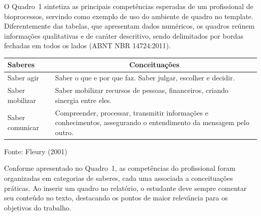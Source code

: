 O Quadro~1 sintetiza as principais competências esperadas de um profissional de bioprocessos, servindo como exemplo de uso do ambiente de quadro no template. Diferentemente das tabelas, que apresentam dados numéricos, os quadros reúnem informações qualitativas e de caráter descritivo, sendo delimitados por bordas fechadas em todos os lados (ABNT NBR 14724:2011).

\centering
{}
\begin{center}
\begin{tabular}{|>{\centering\arraybackslash}m{3.5cm}|m{9cm}|}
\hline
\textbf{Saberes} & \multicolumn{1}{c|}{\textbf{Conceituações}} \\
\hline
Saber agir      & Saber o que e por que faz. Saber julgar, escolher e decidir. \\
\hline
Saber mobilizar & Saber mobilizar recursos de pessoas, financeiros, criando sinergia entre eles. \\
\hline
Saber comunicar & Compreender, processar, transmitir informações e conhecimentos, assegurando o
                  entendimento da mensagem pelo outro. \\
\hline
\end{tabular}
\par\noindent Fonte: Fleury (2001)
\end{center}
\justifying

Conforme apresentado no Quadro~1, as competências do profissional foram organizadas em categorias de saberes, cada uma associada a conceituações práticas. Ao inserir um quadro no relatório, o estudante deve sempre comentar seu conteúdo no texto, destacando os pontos de maior relevância para os objetivos do trabalho.

